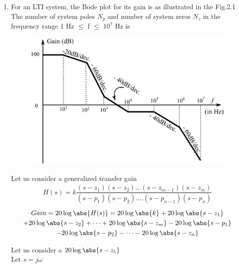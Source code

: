 \begin{enumerate}[label=\thesection.\arabic*.,ref=\thesection.\theenumi]
\item
\textsf{ For an LTI system, the Bode plot for its gain is as illustrated in the Fig.2.1 The number of system poles $N_{p}$ and number of system zeros $N_{z}$ in the frequency range 1 Hz $\leq$ f $\leq$ $10^{7}$ Hz is}

\begin{figure}[htp]
    \centering
    \includegraphics[width=\columnwidth]{./figs/ee18btech11001.eps}
    \caption{}
    \label{fig:galaxy}
\end{figure}

\solution 
\textsf{Let us consider a generalized transfer gain}
\\
\begin{align}
H(s) = k \dfrac{(s-z_{1})(s-z_{2})...(s-z_{m-1})(s-z_{m})}{(s-p_{1})(s-p_{2})....(s-p_{n-1})(s-p_{n})}
\end{align}
\begin{multline}
Gain = 20\log\abs{H(s)} = 20\log \abs{k} + 20\log \abs{s-z_{1}} 
    \\
    + 20\log \abs{s-z_{2}} + \dots + 20\log \abs{s-z_{m}} - 20\log \abs{s-p_{1}} 
    \\
    - 20\log \abs{s-p_{2}} - \dots - 20\log \abs{s-z_{n}} 
\end{multline}



Let us consider a $ 20\log \abs{s-z_{1}} $
\\
Let $s = j\omega$
\\


\end{enumerate}
